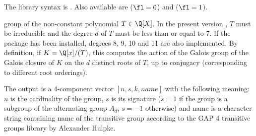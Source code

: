 The library syntax is .
Also available are
 ($\fl = 0$) and
 ($\fl = 1$).

\label{se:polgalois}
 group of the non-constant
polynomial $T\in\Q[X]$. In the present version \vers, $T$ must be irreducible
and the degree $d$ of $T$ must be less than or equal to 7. If the
 package has been installed, degrees 8, 9, 10 and 11 are also
implemented. By definition, if $K = \Q[x]/(T)$, this computes the action of
the Galois group of the Galois closure of $K$ on the $d$ distinct roots of
$T$, up to conjugacy (corresponding to different root orderings).

The output is a 4-component vector $[n,s,k,name]$ with the
following meaning: $n$ is the cardinality of the group, $s$ is its signature
($s=1$ if the group is a subgroup of the alternating group $A_d$, $s=-1$
otherwise) and name is a character string containing name of the transitive
group according to the GAP 4 transitive groups library by Alexander Hulpke.

